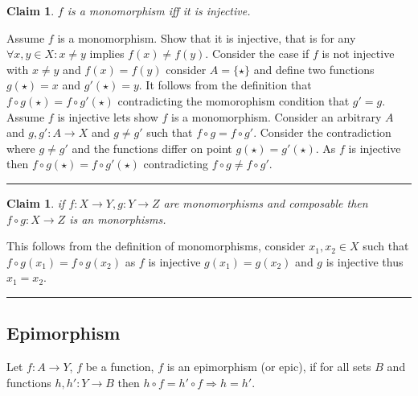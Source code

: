 \documentclass[twoside]{article}
\newtheorem{claim}[theorem]{Claim}
\newenvironment{proof}{{\bf Proof:}}{\hfill\rule{2mm}{2mm}}
\begin{document}
\begin{figure}[H]
       \centering
{}
\end{figure}

\begin{claim}
  $f$ is a monomorphism iff it is injective.
\end{claim}
\begin{proof}
  Assume $f$ is a monomorphism.  Show that it is injective, that is for any $\forall x,y \in X : x \neq y$
  implies $f(x) \neq f(y)$.  Consider the case if $f$ is not injective with  $x \neq y$
  and  $f(x) = f(y)$ consider $A = \{ \star \}$
  and define two functions $g( \star ) = x$ and $g'( \star ) = y$.  It follows from the definition that
  $f \circ g(\star) = f \circ g'(\star)$ contradicting the momorophism condition that
  $g' = g$.\\

  Assume $f$ is injective lets show $f$ is a monomorphism.  Consider an arbitrary $A$ and $g, g' : A \rightarrow X$
  and $g \neq g'$ such that $f \circ g = f \circ g'$.  Consider the contradiction where  $g \neq g'$ and the functions
  differ on point $g(\star) = g'(\star)$.  As $f$ is injective then $f \circ g(\star) = f \circ g'(\star) $ contradicting
  $f \circ g \neq f \circ g'$.

 \end{proof}

\begin{claim}
  if $f : X \rightarrow Y , g : Y \rightarrow Z$ are monomorphisms and composable then $f \circ g : X \rightarrow Z $ is an monorphisms.
\end{claim}


\begin{proof}
  This follows from the definition of monomorphisms, consider $x_1, x_2 \in X$ such that $f \circ g (x_1) = f \circ g (x_2)$ as
  $f$ is injective $g(x_1) = g(x_2)$ and $g$ is injective thus $x_1 = x_2$.
\end{proof}

\subsection{Epimorphism}

Let $f : A \rightarrow Y$, $f$ be a function, $f$ is an epimorphism (or epic), if for all
sets $B$ and functions $h,h' : Y \rightarrow B$ then $h \circ f = h' \circ f \Rightarrow h = h' $.
\end{document}
